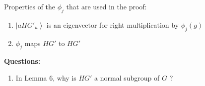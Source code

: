 \documentclass{article}
\newcommand{\ket}[1]{\left| #1 \right\rangle}
\begin{document}
Properties of the $\phi_j$ that are used in the proof:
\begin{enumerate}
\item $\ket{aHG'_u}$ is an eigenvector for right multiplication by $\phi_j(g)$
\item $\phi_j$ maps $HG'$ to $HG'$
\end{enumerate}


\textbf{Questions:}
\begin{enumerate}
\item In Lemma 6, why is $HG'$ a normal subgroup of $G$ ?
\end{enumerate}
\end{document}

